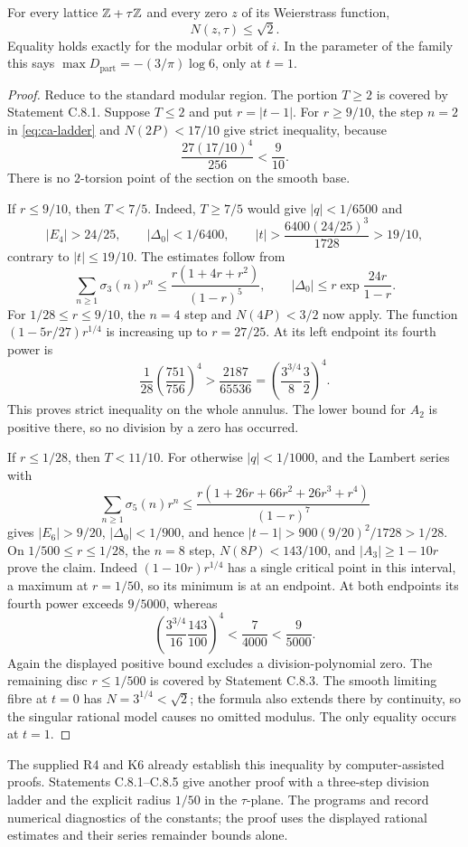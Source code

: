 \begin{statement}
For every lattice $\mathbb Z+\tau\mathbb Z$ and every zero $z$ of its
Weierstrass function,
\[
 N(z,\tau)\le\sqrt2.
\]
Equality holds exactly for the modular orbit of $i$.
In the parameter of the family this says
$\max D_{\mathrm{part}}=-(3/\pi)\log6$, only at $t=1$.
\end{statement}
\begin{proof}
Reduce to the standard modular region. The portion $T\ge2$
is covered by Statement C.8.1. Suppose $T\le2$ and put
$r=|t-1|$. For $r\ge9/10$, the step $n=2$ in
\eqref{eq:ca-ladder} and $N(2P)<17/10$ give strict inequality,
because
\[
 \frac{27(17/10)^4}{256}<\frac9{10}.
\]
There is no $2$-torsion point of the section on the smooth base.

If $r\le9/10$, then $T<7/5$. Indeed, $T\ge7/5$ would give
$|q|<1/6500$ and
\[
 |E_4|>24/25,\qquad |\Delta_0|<1/6400,
 \qquad |t|>\frac{6400(24/25)^3}{1728}>19/10,
\]
contrary to $|t|\le19/10$. The estimates follow from
\[
 \sum_{n\ge1}\sigma_3(n)r^n
 \le\frac{r(1+4r+r^2)}{(1-r)^5},\qquad
 |\Delta_0|\le r\exp\frac{24r}{1-r}.
\]
For $1/28\le r\le9/10$, the $n=4$ step and
$N(4P)<3/2$ now apply. The function
$(1-5r/27)r^{1/4}$ is increasing up to $r=27/25$.
At its left endpoint its fourth power is
\[
 \frac1{28}\left(\frac{751}{756}\right)^4
 >\frac{2187}{65536}
 =\left(\frac{3^{3/4}}8\frac32\right)^4.
\]
This proves strict inequality on the whole annulus. The lower
bound for $A_2$ is positive there, so no division by a zero has
occurred.

If $r\le1/28$, then $T<11/10$. For otherwise $|q|<1/1000$,
and the Lambert series with
\[
 \sum_{n\ge1}\sigma_5(n)r^n
 \le\frac{r(1+26r+66r^2+26r^3+r^4)}{(1-r)^7}
\]
gives $|E_6|>9/20$, $|\Delta_0|<1/900$, and hence
$|t-1|>900(9/20)^2/1728>1/28$.
On $1/500\le r\le1/28$, the $n=8$ step,
$N(8P)<143/100$, and $|A_3|\ge1-10r$ prove the claim.
Indeed $(1-10r)r^{1/4}$ has a single critical point in this
interval, a maximum at $r=1/50$, so its minimum is at an endpoint.
At both endpoints its fourth power exceeds $9/5000$, whereas
\[
 \left(\frac{3^{3/4}}{16}\frac{143}{100}\right)^4
 <\frac7{4000}<\frac9{5000}.
\]
Again the displayed positive bound excludes a division-polynomial
zero. The remaining disc $r\le1/500$ is covered by Statement
C.8.3. The smooth limiting fibre at $t=0$ has
$N=3^{1/4}<\sqrt2$; the formula also extends there by
continuity, so the singular rational model causes no omitted
modulus. The only equality occurs at $t=1$.
\end{proof}

The supplied R4 and K6 already establish this inequality by
computer-assisted proofs. Statements C.8.1--C.8.5 give another
proof with a three-step division ladder and the explicit radius
$1/50$ in the $\tau$-plane. The programs
 and
 record numerical diagnostics
of the constants; the proof uses the displayed rational estimates
and their series remainder bounds alone.
